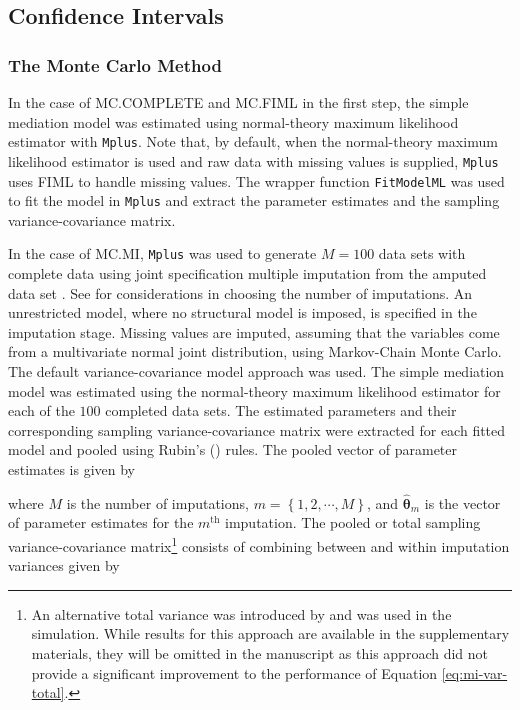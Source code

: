 \documentclass[man]{apa7}\usepackage[]{graphicx}\usepackage[]{xcolor}
\begin{document}
\subsection{Confidence Intervals}

\subsubsection{The Monte Carlo Method}

In the case of MC.COMPLETE and MC.FIML
in the first step,
the simple mediation model was estimated using normal-theory maximum likelihood estimator with \texttt{Mplus}.
Note that, by default, when the normal-theory maximum likelihood estimator is used and raw data with missing values is supplied, \texttt{Mplus} uses FIML to handle missing values.
The wrapper function \texttt{FitModelML} was used to fit the model in \texttt{Mplus} and extract the parameter estimates and the sampling variance-covariance matrix.

In the case of MC.MI,
\texttt{Mplus} was used to generate $M = 100$ data sets with complete data using joint specification multiple imputation from the amputed data set 
\parencite{Lib-Missing-Data-Multiple-Imputation-Asparouhov-2022}.
See
\Textcite{Lib-Missing-Data-Multiple-Imputation-Graham-2007}
for considerations in choosing the number of imputations.
An unrestricted model, where no structural model is imposed, is specified in the imputation stage.
Missing values are imputed, assuming that the variables come from a multivariate normal joint distribution,
using Markov-Chain Monte Carlo.
The default variance-covariance model approach was used.
The simple mediation model was estimated using the normal-theory maximum likelihood estimator for each of the $100$ completed data sets.
The estimated parameters and their corresponding sampling variance-covariance matrix were extracted for each fitted model and pooled using Rubin's (\citeyear{Lib-Missing-Data-Books-Rubin-1987})
rules.
The pooled vector of parameter estimates is given by



\noindent where $M$ is the number of imputations,
$m = \left\{ 1, 2, \cdots, M \right\}$,
and
$\hat{\boldsymbol{\theta}}_{m}$
is the vector of parameter estimates for the $m^{\mathrm{th}}$ imputation.
The pooled or total sampling variance-covariance matrix\footnote{An alternative total variance was introduced by
	\Textcite{Lib-Missing-Data-Multiple-Imputation-Li-1991} and was used in the simulation.
	While results for this approach are available in the supplementary materials,
	they will be omitted in the manuscript as this approach did not provide a significant improvement to the performance of Equation \ref{eq:mi-var-total}.}
consists of combining between and within imputation variances
given by
\end{document}
